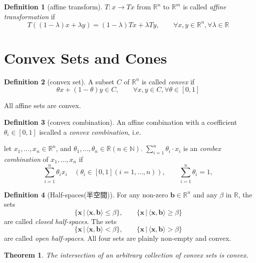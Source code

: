 \documentclass{jsarticle}
\newtheorem{thm}{Theorem}[section]
\theoremstyle{definition}
\newtheorem{dfn}{Definition}[section]
\begin{document}
\begin{dfn}[affine transform]
$T: x \to Tx$ from $\mathbb{R}^n$ to $\mathbb{R}^m$ is called
\textit{affine transformation} if
\[
T((1 - \lambda)x + \lambda y) = (1 - \lambda)Tx + \lambda Ty ,
\qquad \forall x, y \in \mathbb{R}^n, \forall \lambda \in
\mathbb{R}
\]
\end{dfn}




\section{Convex Sets and Cones}
 
\begin{dfn}[convex set]
A subset $C$ of $\mathbb{R}^n $ is called \textit{convex} if
\[
\theta x + (1 - \theta )y \in C, \qquad \forall x, y \in C,
\forall \theta \in [0, 1]
\]
\end{dfn}

All affine sets are convex.

\begin{dfn}[convex combination]

An affine combination with a coefficient $\theta_i \in [0,1]$ iscalled a \textit{convex combination}, i.e.

let $x_1,...,x_n \in \mathbb{R}^n $, and $\theta_1,..., \theta_n\in \mathbb{R} (n \in \mathbb{N})$.
$\sum \limits_{i=1}^n \theta_i \cdot x_i $ is an \textit{combex
combination} of $x_1, ..., x_n$ if
\[
\sum \limits_{i=1}^n \theta_i x_i \quad (\theta_i \in
[0,1] (i = 1,...,n)), \qquad \sum \limits_{i=1}^n \theta_i = 1,
\]
\end{dfn}


\begin{dfn}[Half-spaces(半空間)]

For any non-zero $\bm{b} \in \mathbb{R}^n$ and any $\beta$ in
$\mathbb{R}$, the sets
\[
\{ \bm{x} \, | \, \langle \bm{x}, \bm{b}\rangle \le \beta \},
\qquad \{ \bm{x} \, | \, \langle \bm{x}, \bm{b}\rangle \ge \beta\}
\]
are called \textit{closed half-spaces}.  The sets
\[
\{ \bm{x} \, | \, \langle \bm{x}, \bm{b}\rangle < \beta \},
\qquad \{ \bm{x} \, | \, \langle \bm{x}, \bm{b}\rangle > \beta
\}
\]
are called \textit{open half-spaces}. All four sets are plainly
non-empty and convex.
\end{dfn}


\begin{thm}
The intersection of an arbitrary collection of convex sets is convex.
\end{thm}
\end{document}
